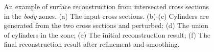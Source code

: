 \begin{figure} [htbp]
{\begin{minipage}[b]{0.22\textwidth}
    \end{minipage}}
  \caption{An example of surface reconstruction from intersected cross sections in the \textit{body} zones. (a) The input cross sections. (b)-(c) Cylinders are generated from the two cross sections and perturbed; (d) The union of cylinders in the zone; (e) The initial reconstruction result; (f) The final reconstruction result after refinement and smoothing.}
  \label{fig:csinters} %
\end{figure}

